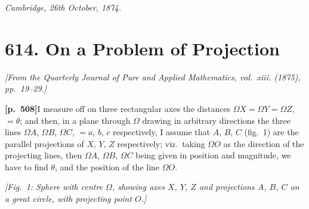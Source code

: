 \documentclass[11pt,a4paper]{article}
\begin{document}
\medskip
\noindent\textit{Cambridge, 26th October, 1874.}

\newpage

\section*{\textbf{614.} On a Problem of Projection}

\textit{[From the Quarterly Journal of Pure and Applied Mathematics, vol.~xiii. (1875), pp.~19--29.]}

\bigskip

\noindent\textbf{[p.~508]}\quad I measure off on three rectangular axes the distances $\Omega X = \Omega Y = \Omega Z$, $= \theta$; and then, in a plane through $\Omega$ drawing in arbitrary directions the three lines $\Omega A$, $\Omega B$, $\Omega C$, $= a$, $b$, $c$ respectively, I assume that $A$, $B$, $C$ (fig.~1) are the parallel projections of $X$, $Y$, $Z$ respectively; viz.\ taking $\Omega O$ as the direction of the projecting lines, then $\Omega A$, $\Omega B$, $\Omega C$ being given in position and magnitude, we have to find $\theta$, and the position of the line $\Omega O$.

\begin{center}
\textit{[Fig.~1: Sphere with centre $\Omega$, showing axes $X$, $Y$, $Z$ and projections $A$, $B$, $C$ on a great circle, with projecting point $O$.]}
\end{center}
\end{document}
